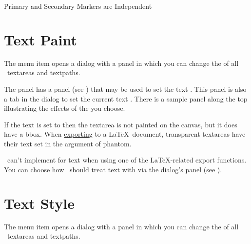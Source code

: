 {}
{Primary and Secondary Markers are Independent}

\section{Text Paint}\label{sec:textpaint}


The  menu item opens a dialog
with a  panel in which
you can change the  
of all \selected\ \glspl{textarea} and \glspl{textpath}.


The  panel has a  panel
(see ) that may be used to set the 
text . This panel is also a tab
in the  dialog to set the current
text .
There is a sample panel along the top illustrating the effects of
the  you choose.

\begin{information}
If the text  is set to 
then the \gls{textarea} is not painted on the canvas, but it does
have a \gls{bbox}. When \hyperref[sec:exportimage]{exporting} to a
\LaTeX\ document, \gls{transparent} \glspl*{textarea} have their
text set in the argument of \gls{phantom}.
\end{information}

\FlowframTk\ can't implement  for text when
using one of the \LaTeX-related export functions. You can choose
how \FlowframTk\ should treat text with  via the
 dialog's  panel 
(see ).


\section{Text Style}\label{sec:textstyle}


The  menu item opens a dialog
with a  panel in which
you can change the  
of all \selected\ \glspl{textarea} and \glspl{textpath}.


